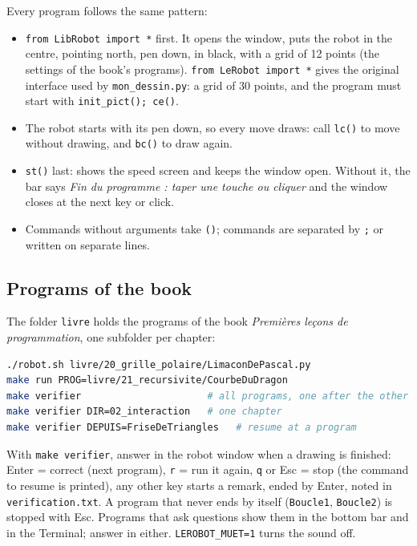 \documentclass[11pt,a4paper]{article}
\newcommand{\kbd}[1]{\texttt{#1}}
\begin{document}
Every program follows the same pattern:
\begin{itemize}
\item \kbd{from LibRobot import *} first. It opens the window, puts the
  robot in the centre, pointing north, pen down, in black, with a grid of
  12 points (the settings of the book's programs). \kbd{from LeRobot import *}
  gives the original interface used by \kbd{mon\_dessin.py}: a grid of 30
  points, and the program must start with \kbd{init\_pict(); ce()}.
\item The robot starts with its pen down, so every move draws: call
  \kbd{lc()} to move without drawing, and \kbd{bc()} to draw again.
\item \kbd{st()} last: shows the speed screen and keeps the window open.
  Without it, the bar says \emph{Fin du programme : taper une touche ou
  cliquer} and the window closes at the next key or click.
\item Commands without arguments take \kbd{()}; commands are separated by
  \kbd{;} or written on separate lines.
\end{itemize}

\subsection{Programs of the book}
The folder \kbd{livre} holds the programs of the book \emph{Premières
leçons de programmation}, one subfolder per chapter:
\begin{lstlisting}[language=bash]
./robot.sh livre/20_grille_polaire/LimaconDePascal.py
make run PROG=livre/21_recursivite/CourbeDuDragon
make verifier                      # all programs, one after the other
make verifier DIR=02_interaction   # one chapter
make verifier DEPUIS=FriseDeTriangles   # resume at a program
\end{lstlisting}
With \kbd{make verifier}, answer in the robot window when a drawing is
finished: Enter = correct (next program), \kbd{r} = run it again, \kbd{q}
or Esc = stop (the command to resume is printed), any other key starts a
remark, ended by Enter, noted in \kbd{verification.txt}. A program that
never ends by itself (\kbd{Boucle1}, \kbd{Boucle2}) is stopped with Esc.
Programs that ask questions show them in the bottom bar and in the
Terminal; answer in either. \kbd{LEROBOT\_MUET=1} turns the sound off.
\end{document}
